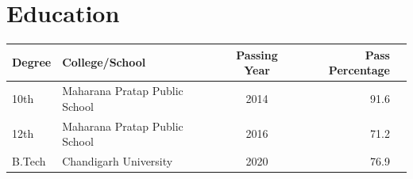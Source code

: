 \documentclass[11pt]{article}
\begin{document}
\section{Education}
\begin{flushright}

\begin{tabular}{||l|l|c|r|r||}
\hline
Degree & College/School  & Passing Year & Pass Percentage \\
\hline 
10th & Maharana Pratap Public School & 2014 & 91.6\\
12th & Maharana Pratap Public School & 2016 & 71.2\\
B.Tech & Chandigarh University & 2020 & 76.9\\
\hline
\end{tabular}
 \end{flushright} 

\end{document}
